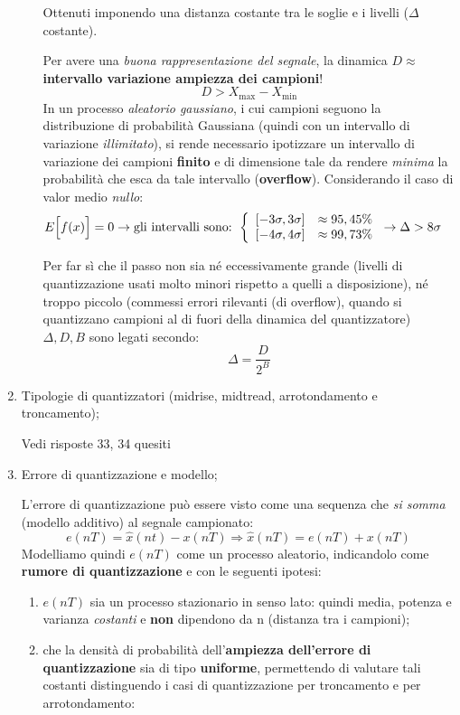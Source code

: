 \documentclass[
]{article}
\begin{document}
\begin{enumerate}
\begin{itemize}
    Ottenuti imponendo una distanza costante tra le soglie e i livelli
    (\(\Delta\) costante).

    Per avere una \emph{buona rappresentazione del segnale}, la dinamica
    \(D \approx\) \textbf{intervallo variazione ampiezza dei campioni}!
    \[
      D > X_{\text{max}}-X_{\text{min}}
      \] In un processo \emph{aleatorio gaussiano}, i cui campioni
    seguono la distribuzione di probabilità Gaussiana (quindi con un
    intervallo di variazione \emph{illimitato}), si rende necessario
    ipotizzare un intervallo di variazione dei campioni \textbf{finito}
    e di dimensione tale da rendere \emph{minima} la probabilità che
    esca da tale intervallo (\textbf{overflow}). Considerando il caso di
    valor medio \emph{nullo}: \begin{align*}
      E\Big[f(x)\Big]=0 &\to \text{gli intervalli sono: }
      \left\{\begin{array}{cl}
      [-3\sigma, 3\sigma] & \approx 95,45 \% \\ \relax 
      [-4\sigma, 4\sigma] & \approx 99,73 \%
      \end{array} \right. \to \Delta > 8\sigma
      \end{align*}

    Per far sì che il passo non sia né eccessivamente grande (livelli di
    quantizzazione usati molto minori rispetto a quelli a disposizione),
    né troppo piccolo (commessi errori rilevanti (di overflow), quando
    si quantizzano campioni al di fuori della dinamica del
    quantizzatore) \(\Delta, D, B\) sono legati secondo: \[
      \Delta=\frac{D}{2^B}
      \]
  \end{itemize}
\item
  Tipologie di quantizzatori (midrise, midtread, arrotondamento e
  troncamento);

  Vedi risposte 33, 34 quesiti
\item
  Errore di quantizzazione e modello;

  L'errore di quantizzazione può essere visto come una sequenza che
  \emph{si somma} (modello additivo) al segnale campionato: \[
  e(nT)=\hat{x}(nt)-x(nT) \Rightarrow \hat{x}(nT) = e(nT)+x(nT)
  \] Modelliamo quindi \(e(nT)\) come un processo aleatorio, indicandolo
  come \textbf{rumore di quantizzazione} e con le seguenti ipotesi:

  \begin{enumerate}
  \def\labelenumii{\arabic{enumii}.}
  \item
    \(e(nT)\) sia un processo stazionario in senso lato: quindi media,
    potenza e varianza \emph{costanti} e \textbf{non} dipendono da n
    (distanza tra i campioni);
  \item
    che la densità di probabilità dell'\textbf{ampiezza dell'errore di
    quantizzazione} sia di tipo \textbf{uniforme}, permettendo di
    valutare tali costanti distinguendo i casi di quantizzazione per
    troncamento e per arrotondamento:


\end{enumerate}
\end{enumerate}
\end{document}

